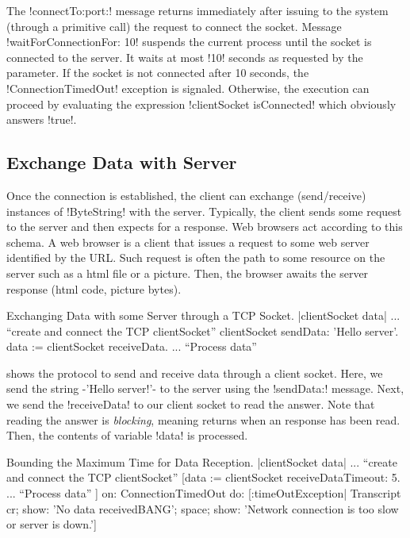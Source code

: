 \documentclass[a4paper,10pt,twoside]{book}
\begin{document}
The \ct!connectTo:port:!  message returns immediately after issuing to the system (through a primitive call) the request to connect the socket.
Message \ct!waitForConnectionFor: 10! suspends the current process until the socket is connected to the server.
It waits at most \ct!10! seconds as requested by the parameter.
If the socket is not connected after 10 seconds, the \ct!ConnectionTimedOut! exception is signaled. 
Otherwise, the execution can proceed by evaluating the expression \ct!clientSocket isConnected! which obviously answers \ct!true!.



\subsection{Exchange Data with Server}
\label{sec:exchangeData}
Once the connection is established, the client can exchange (send/receive) instances of \ct!ByteString! with the server.
Typically, the client sends some request to the server and then expects for a response.
Web browsers act according to this schema.
A web browser is a client that issues a request to some web server identified by the URL.
Such request is often the path to some resource on the server such as a html file or a picture.
Then, the browser awaits the server response (\eg html code, picture bytes).

\begin{script}[dataExhangeWithTcpSocket]{Exchanging Data with some Server through a TCP Socket.}
|clientSocket data|
... ``create and connect the TCP clientSocket''
clientSocket sendData: 'Hello server'.
data := clientSocket receiveData.
... ``Process data''
\end{script}

 shows the protocol to send and receive data through a client socket.
Here, we send the string \ct-'Hello server!'- to the server using the \ct!sendData:! message.
Next, we send the \ct!receiveData! to our client socket to read the answer. Note that reading the answer is \emph{blocking}, meaning  returns when an response has been read. Then, the contents of variable \ct!data! is processed.

\begin{script}[dataReceptionTimeOut]{Bounding the Maximum Time for Data Reception.}
|clientSocket data|
... ``create and connect the TCP clientSocket''
[data := clientSocket receiveDataTimeout: 5.
... ``Process data''
] on: ConnectionTimedOut 
do: [:timeOutException|
	Transcript 
		cr; 
		show: 'No data receivedBANG';
		space;
		show: 'Network connection is too slow or server is down.']
\end{script}
\end{document}
